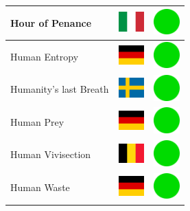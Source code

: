 \documentclass[12pt, a4paper, twoside]{report}
\begin{document}
\begin{center}
\begin{longtable}{|p{5cm}|p{2cm}|p{2cm}|}
 Hour of Penance                                            & \includegraphics[width=1cm]{../img/flags/it} &   \includegraphics[width=1cm]{../likes/y} \\ \hline
 Human Entropy                                              & \includegraphics[width=1cm]{../img/flags/de} &   \includegraphics[width=1cm]{../likes/y} \\ \hline
 Humanity's last Breath                                     & \includegraphics[width=1cm]{../img/flags/se} &   \includegraphics[width=1cm]{../likes/y} \\ \hline
 Human Prey                                                 & \includegraphics[width=1cm]{../img/flags/de} &   \includegraphics[width=1cm]{../likes/y} \\ \hline
 Human Vivisection                                          & \includegraphics[width=1cm]{../img/flags/be} &   \includegraphics[width=1cm]{../likes/y} \\ \hline
 Human Waste                                                & \includegraphics[width=1cm]{../img/flags/de} &   \includegraphics[width=1cm]{../likes/y} \\ \hline

\end{longtable}
\end{center}
\end{document}
